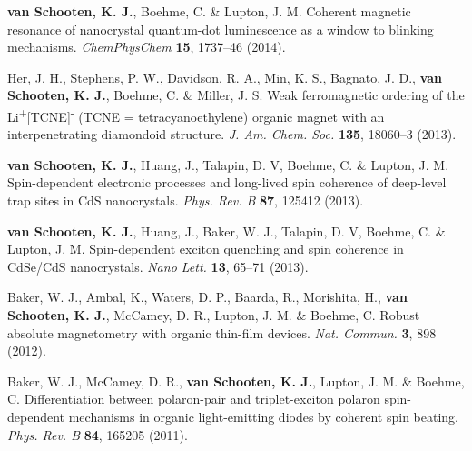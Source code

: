 \documentclass[11pt,letterpaper]{article}
\begin{document}
\begin{bibenum}
	\item \textbf{van Schooten, K. J.}, Boehme, C. \& Lupton, J. M. Coherent magnetic resonance of nanocrystal quantum-dot luminescence as a window to blinking mechanisms. \textit{ChemPhysChem} \textbf{15}, 1737--46 (2014).  

	\item Her, J. H., Stephens, P. W., Davidson, R. A., Min, K. S., Bagnato, J. D., \textbf{van Schooten, K. J.}, Boehme, C. \& Miller, J. S.	Weak ferromagnetic ordering of the Li\textsuperscript{+}[TCNE]\textsuperscript{\textbullet -} (TCNE = tetracyanoethylene) organic magnet with an interpenetrating diamondoid structure. \textit{J. Am. Chem. Soc.} \textbf{135}, 18060--3 (2013).  
	
	\item \textbf{van Schooten, K. J.}, Huang, J., Talapin, D. V, Boehme, C. \& Lupton, J. M. Spin-dependent electronic processes and long-lived spin coherence of deep-level trap sites in CdS nanocrystals. \textit{Phys. Rev. B} \textbf{87}, 125412 (2013).  
	
	\item \textbf{van Schooten, K. J.}, Huang, J., Baker, W. J., Talapin, D. V, Boehme, C. \& Lupton, J. M. Spin-dependent exciton quenching and spin coherence in CdSe/CdS nanocrystals. \textit{Nano Lett.} \textbf{13}, 65--71 (2013).  

	\item Baker, W. J., Ambal, K., Waters, D. P., Baarda, R., Morishita, H., \textbf{van Schooten, K. J.}, McCamey, D. R., Lupton, J. M. \& Boehme, C. Robust absolute magnetometry with organic thin-film devices. \textit{Nat. Commun.} \textbf{3}, 898 (2012).  

	\item Baker, W. J., McCamey, D. R., \textbf{van Schooten, K. J.}, Lupton, J. M. \& Boehme, C. Differentiation between polaron-pair and triplet-exciton polaron spin-dependent mechanisms in organic light-emitting diodes by coherent spin beating. \textit{Phys. Rev. B} \textbf{84}, 165205 (2011).  
	

\end{bibenum}
\end{document}
